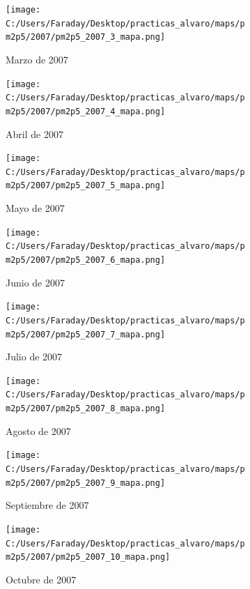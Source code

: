 \documentclass[12pt]{article}
\begin{document}
\begin{figure}[H]
\centering
\begin{subfigure}[h]{0.45\textwidth}
\texttt{[image: C:/Users/Faraday/Desktop/practicas\_alvaro/maps/pm2p5/2007/pm2p5\_2007\_3\_mapa.png]}
\caption{Marzo de 2007}
\label{fig:map-mon-4-3-2007}
\end{subfigure}
%
\begin{subfigure}[H]{0.45\textwidth}
\texttt{[image: C:/Users/Faraday/Desktop/practicas\_alvaro/maps/pm2p5/2007/pm2p5\_2007\_4\_mapa.png]}
\caption{Abril de 2007}
\label{fig:map-mon-4-4-2007}
\end{subfigure}
\caption{}
\end{figure}

\begin{figure}[H]
\centering
\begin{subfigure}[h]{0.45\textwidth}
\texttt{[image: C:/Users/Faraday/Desktop/practicas\_alvaro/maps/pm2p5/2007/pm2p5\_2007\_5\_mapa.png]}
\caption{Mayo de 2007}
\label{fig:map-mon-4-5-2007}
\end{subfigure}
%
\begin{subfigure}[H]{0.45\textwidth}
\texttt{[image: C:/Users/Faraday/Desktop/practicas\_alvaro/maps/pm2p5/2007/pm2p5\_2007\_6\_mapa.png]}
\caption{Junio de 2007}
\label{fig:map-mon-4-6-2007}
\end{subfigure}
\caption{}
\end{figure}

\newpage

\begin{figure}[H]
\centering
\begin{subfigure}[h]{0.45\textwidth}
\texttt{[image: C:/Users/Faraday/Desktop/practicas\_alvaro/maps/pm2p5/2007/pm2p5\_2007\_7\_mapa.png]}
\caption{Julio de 2007}
\label{fig:map-mon-4-7-2007}
\end{subfigure}
%
\begin{subfigure}[H]{0.45\textwidth}
\texttt{[image: C:/Users/Faraday/Desktop/practicas\_alvaro/maps/pm2p5/2007/pm2p5\_2007\_8\_mapa.png]}
\caption{Agosto de 2007}
\label{fig:map-mon-4-8-2007}
\end{subfigure}
\caption{}
\end{figure}

\begin{figure}[H]
\centering
\begin{subfigure}[h]{0.45\textwidth}
\texttt{[image: C:/Users/Faraday/Desktop/practicas\_alvaro/maps/pm2p5/2007/pm2p5\_2007\_9\_mapa.png]}
\caption{Septiembre de 2007}
\label{fig:map-mon-4-9-2007}
\end{subfigure}
%
\begin{subfigure}[H]{0.45\textwidth}
\texttt{[image: C:/Users/Faraday/Desktop/practicas\_alvaro/maps/pm2p5/2007/pm2p5\_2007\_10\_mapa.png]}
\caption{Octubre de 2007}
\label{fig:map-mon-4-10-2007}
\end{subfigure}
\caption{}
\end{figure}
\end{document}
